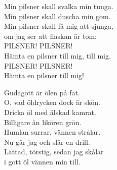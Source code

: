 \documentclass[a6paper,10pt]{article}
\begin{document}
\setlength{\oddsidemargin}{-0.37in}
\begin{center}
\end{center}
\begin{lyrics}
Min pilsner skall svalka min tunga. \\
Min pilsner skall duscha min gom. \\
Min pilsner skall få mig att sjunga, \\
om jag ser att flaskan är tom: \\
\newline
PILSNER! PILSNER! \\
Hämta en pilsner till mig, till mig. \\
PILSNER! PILSNER! \\
Hämta en pilsner till mig!
\end{lyrics}
\vspace{40pt}
\begin{center}
\end{center}
\begin{lyrics}
Gudagott är ölen på fat. \\
O, vad öldrycken dock är skön. \\
Dricka öl med älskad kamrat. \\
Billigare än likören grön. \\
Humlan surrar, vännen strålar. \\
Nu går jag och slår en drill. \\
Lättad, törstig, sedan jag skålar \\
i gott öl vännen min till. 
\end{lyrics}
\end{document}
